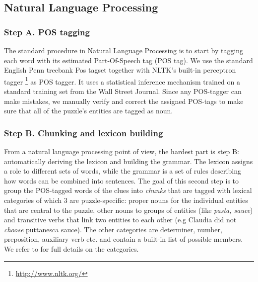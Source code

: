 \subsection{Natural Language Processing}\label{sec:pipeline:nlp}

\subsubsection*{Step A. POS tagging} The standard procedure in Natural Language Processing is to start by tagging each word with its estimated Part-Of-Speech tag (POS tag).
We use the standard English Penn treebank Pos tagset \cite{marcus1993building} together with NLTK's built-in perceptron tagger \footnote{\url{http://www.nltk.org/}} as POS tagger. 
It uses a statistical inference mechanism trained on a standard training set from the Wall Street Journal. 
Since any POS-tagger can make mistakes, we manually verify and correct the assigned POS-tags to make sure that all of the puzzle’s entities are tagged as noun.
	

\subsubsection*{Step B. Chunking and lexicon building} From a natural language processing point of view, the hardest part is step B: automatically deriving the lexicon and building the grammar.
The lexicon assigns a role to different sets of words, while the grammar is a set of rules describing how words can be combined into sentences. 
The goal of this second step is to group the POS-tagged words of the clues into \textit{chunks} that are tagged with lexical categories of which 3 are puzzle-specific: proper nouns for the individual entities that are central to the puzzle, other nouns to groups of entities (like \textit{pasta, sauce}) and transitive verbs that link two entities to each other (e.g Claudia did not \textit{choose} puttanesca sauce). 
The other categories are determiner, number, preposition, auxiliary verb etc.  and contain a built-in list of possible members.  We refer to \cite{msc/Claes17} for full details on the categories.

